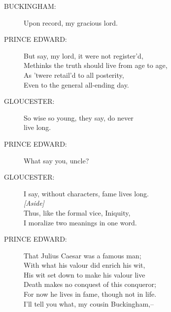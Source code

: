\documentclass{article}
\begin{document}
\begin{description}
\item[BUCKINGHAM:] 
\hspace{1pt}Upon record, my gracious lord.\\
\end{description}
\begin{description}
\item[PRINCE EDWARD:] 
\hspace{1pt}But say, my lord, it were not register'd,\\
\hspace{1pt}Methinks the truth should live from age to age,\\
\hspace{1pt}As 'twere retail'd to all posterity,\\
\hspace{1pt}Even to the general all-ending day.\\
\end{description}
\begin{description}
\item[GLOUCESTER:] 
\hspace{1pt}  So wise so young, they say, do never\\
\hspace{1pt}live long.\\
\end{description}
\begin{description}
\item[PRINCE EDWARD:] 
\hspace{1pt}What say you, uncle?\\
\end{description}
\begin{description}
\item[GLOUCESTER:] 
\hspace{1pt}I say, without characters, fame lives long.\\
{\it [Aside]}\\
\hspace{1pt}Thus, like the formal vice, Iniquity,\\
\hspace{1pt}I moralize two meanings in one word.\\
\end{description}
\begin{description}
\item[PRINCE EDWARD:] 
\hspace{1pt}That Julius Caesar was a famous man;\\
\hspace{1pt}With what his valour did enrich his wit,\\
\hspace{1pt}His wit set down to make his valour live\\
\hspace{1pt}Death makes no conquest of this conqueror;\\
\hspace{1pt}For now he lives in fame, though not in life.\\
\hspace{1pt}I'll tell you what, my cousin Buckingham,--\\
\end{description}
\end{document}
